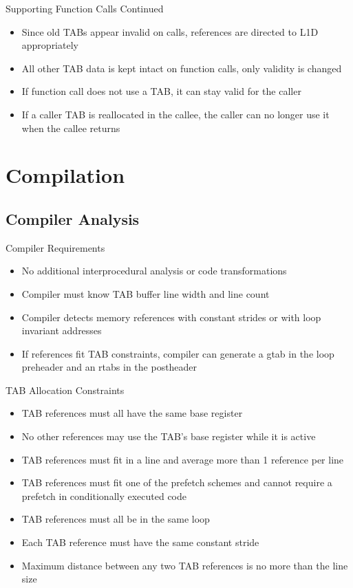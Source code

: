 \documentclass{beamer}
\begin{document}
\begin{frame}{Supporting Function Calls Continued}
   \begin{itemize}
      \item Since old TABs appear invalid on calls, references are directed to
         L1D appropriately
      \item All other TAB data is kept intact on function calls, 
         only validity is changed
      \item If function call does not use a TAB, it can stay valid for the caller
      \item If a caller TAB is reallocated in the callee, the caller can no longer
         use it when the callee returns
   \end{itemize}
\end{frame}
\section{Compilation}
\subsection{Compiler Analysis}
\begin{frame}{Compiler Requirements}
   \begin{itemize}
      \item No additional interprocedural analysis or code transformations
      \item Compiler must know TAB buffer line width and line count
      \item Compiler detects memory references with constant strides or with
         loop invariant addresses
      \item If references fit TAB constraints, compiler can generate a gtab in
         the loop preheader and an rtabs in the postheader
   \end{itemize}
\end{frame}
\begin{frame}{TAB Allocation Constraints}
   \begin{itemize}
      \item TAB references must all have the same base register
      \item No other references may use the TAB's base register
         while it is active
      \item TAB references must fit in a line and average more than 1 
         reference per line
      \item TAB references must fit one of the prefetch schemes and cannot require
         a prefetch in conditionally executed code
      \item TAB references must all be in the same loop
      \item Each TAB reference must have the same constant stride
      \item Maximum distance between any two TAB references is no more 
         than the line size
   \end{itemize}
\end{frame}
\end{document}
